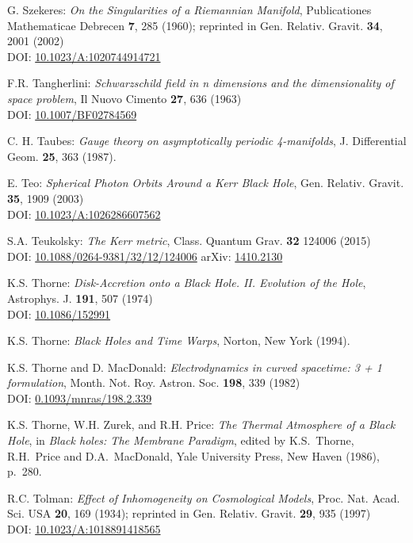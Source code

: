 \begin{thebibliography}{123}
G. Szekeres:
{\em On the Singularities of a Riemannian Manifold},
Publicationes Mathematicae Debrecen {\bf 7}, 285 (1960); reprinted in
Gen. Relativ. Gravit. {\bf 34}, 2001 (2002)\\
DOI: \href{https://doi.org/10.1023/A:1020744914721}{10.1023/A:1020744914721}

F.R. Tangherlini:
{\em Schwarzschild field in n dimensions and the dimensionality of space problem},
Il Nuovo Cimento {\bf 27}, 636 (1963)\\
DOI: \href{https://doi.org/10.1007/BF02784569}{10.1007/BF02784569}

C. H. Taubes:
{\em Gauge theory on asymptotically periodic 4-manifolds},
J. Differential Geom. {\bf 25}, 363 (1987).

E. Teo:
{\em Spherical Photon Orbits Around a Kerr Black Hole},
Gen. Relativ. Gravit. {\bf 35}, 1909 (2003)\\
DOI: \href{https://doi.org/10.1023/A:1026286607562}{10.1023/A:1026286607562}

S.A. Teukolsky:
{\em The Kerr metric},
Class. Quantum Grav. {\bf 32} 124006 (2015)\\
DOI: \href{https://doi.org/10.1088/0264-9381/32/12/124006}{10.1088/0264-9381/32/12/124006}\hfill
arXiv: \href{https://arxiv.org/abs/1410.2130}{1410.2130}

K.S. Thorne:
{\em Disk-Accretion onto a Black Hole. II. Evolution of the Hole},
Astrophys. J. {\bf 191}, 507 (1974)\\
DOI: \href{https://doi.org/10.1086/152991}{10.1086/152991}

K.S. Thorne:
{\em Black Holes and Time Warps},
Norton, New York (1994).

K.S. Thorne and D. MacDonald:
{\em Electrodynamics in curved spacetime: 3 + 1 formulation},
Month. Not. Roy. Astron. Soc. {\bf 198}, 339 (1982)\\
DOI: \href{https://doi.org/10.1093/mnras/198.2.339}{0.1093/mnras/198.2.339}

K.S. Thorne, W.H. Zurek, and R.H. Price:
{\em The Thermal Atmosphere of a Black Hole},
in {\em Black holes: The Membrane Paradigm},
edited by  K.S.~Thorne, R.H.~Price and D.A.~MacDonald,
Yale University Press, New Haven (1986), p.~280.

R.C. Tolman:
{\em Effect of Inhomogeneity on Cosmological Models},
Proc. Nat. Acad. Sci. USA {\bf 20}, 169 (1934);
reprinted in Gen. Relativ. Gravit. {\bf 29}, 935 (1997)\\
DOI: \href{https://doi.org/10.1023/A:1018891418565}{10.1023/A:1018891418565}


\end{thebibliography}

